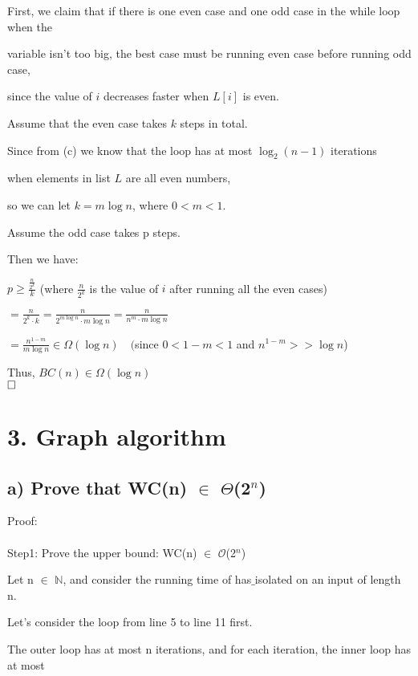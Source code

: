 \documentclass[12pt]{article}
\begin{document}
First, we claim that if there is one even case and one odd case in the while loop when the 

variable isn't too big, the best case must be running even case before running odd case,

since the value of $i$ decreases faster when $L[i]$ is even.

Assume that the even case takes $k$ steps in total.

Since from (c) we know that the loop has at most $\log_2{(n-1)}$ iterations 

when elements in list $L$ are all even numbers,

so we can let $k=m\log{n}$, where $0<m<1$.

Assume the odd case takes p steps.

Then we have:

$p \geq \frac{\frac{n}{2^k}}{k}$ (where $\frac{n}{2^k}$ is the value of $i$ after running all the even cases)

$ = \frac{n}{2^k \cdot k} = \frac{n}{2^{m\log{n}} \cdot m\log{n}} = \frac{n}{n^m \cdot m\log{n}} $

$ = \frac{n^{1-m}}{m \log{n}} \in \Omega(\log{n})  \quad ($since $ 0 < 1-m < 1 $ and $ n^{1-m} >> \log{n}$)

Thus, $BC(n) \in \Omega(\log{n})$ \\



$\hfill\square$
\newpage

\section*{3. Graph algorithm}
\vspace{20pt}
\subsection*{a) Prove that WC(n) $\in$ $\Theta$(2$^{n}$)}
\vspace{20pt}
Proof:\\
\\
Step1: Prove the upper bound:  WC(n) $\in$ $\mathcal{O}$(2$^{n}$)

Let n $\in$ $\mathbb{N}$, and consider the running time of has$\_$isolated on an input of length n.

Let's consider the loop from line 5 to line 11 first.

The outer loop has at most n iterations, and for each iteration, the inner loop has at most
\end{document}
